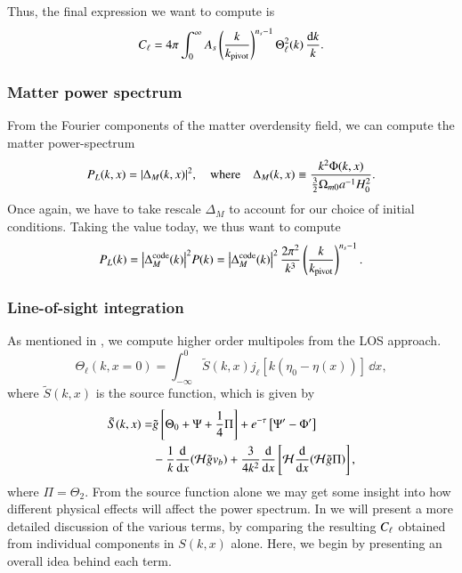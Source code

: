 Thus, the final expression we want to compute is 
\begin{equation} \label{eq:M4:theory:CMB_power_spectrum}
    C_\ell = 4\pi \int_0^\infty A_s \left( \frac{k}{k_\mathrm{pivot}} \right)^{n_s-1} \Theta_\ell^2(k) \, \frac{\dd k}{k}.
\end{equation}

\subsubsection{Matter power spectrum} \label{sssec:M4:theory:matter_power_spectrum}
From the Fourier components of the matter overdensity field, we can compute the matter power-spectrum
\begin{equation} \label{eq:M4:theory:MatterPS_of_x_k}
    P_L(k,x) = \abs{\Delta_M(k,x)}^2,\quad \text{where}\quad \Delta_M(k,x) \equiv \frac{k^2 \Phi(k,x)}{\frac{3}{2}\Omega_{m0} a^{-1} H_0^2}.
\end{equation}
Once again, we have to take rescale $\Delta_M$ to account for our choice of initial conditions. Taking the value today, we thus want to compute 
\begin{equation} \label{eq:M4:theory:MatterPS_code_today}
    P_L(k) = \abs{\Delta_M^\mathrm{code}(k)}^2 P(k) = \abs{\Delta_M^\mathrm{code}(k)}^2\, \frac{2\pi^2}{k^3}\left( \frac{k}{k_\mathrm{pivot}} \right)^{n_s-1}.
\end{equation}

\subsubsection{Line-of-sight integration}\label{sssec:M4:theory:line_of_sight_integration}
As mentioned in , we compute higher order multipoles from the LOS approach. 
\begin{equation} \label{eq:M4:theory:Theta_ell_LOS_integration}
    \Theta_\ell(k,x=0) = \int_{-\infty}^0 \tilde{S}(k,x) j_\ell [k(\eta_0 - \eta(x))]\,\dd x, 
\end{equation}
where $\tilde{S}(k,x)$ is the source function, which is given by 
\begin{equation} \label{eq:M4:theory:source_function_LOS}
    \begin{split}
        \tilde{S}(k,x) =& \tilde{g} \left[ \Theta_0 + \Psi + \frac{1}{4} \Pi \right] + e^{-\tau}\left[ \Psi' - \Phi' \right] \\
        & - \frac{1}{k}\dv{x}(\mathcal{H} \tilde{g} v_b) + \frac{3}{4k^2}\dv{x}\left[ \mathcal{H} \dv{x}(\mathcal{H}\tilde{g}\Pi) \right],
    \end{split}
\end{equation}
where $\Pi=\Theta_2$. From the source function alone we may get some insight into how different physical effects will affect the power spectrum. In  we will present a more detailed discussion of the various terms, by comparing the resulting $C_\ell$ obtained from individual components in $S(k,x)$ alone. Here, we begin by presenting an overall idea behind each term.  

